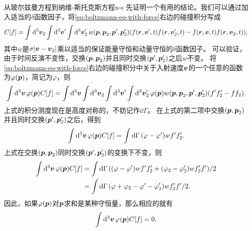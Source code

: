 \begin{back}{从玻尔兹曼方程到纳维-斯托克斯方程}{n-s}
    先证明一个有用的结论。我们可以通过加入适当的$\delta$函数因子，将\eqref{eq:boltzmann-eq-with-force}右边的碰撞积分写成
    \begin{equation}
        C[f] = \int \dd[3]{\vb*{v}_2} \int \dd[3]{\vb*{v}'} \int \dd[3]{\vb*{v}_2'} w(\vb*{p}, \vb*{p}_2, \vb*{p}', \vb*{p}_2') (f(\vb*{r}, \vb*{v}', t) f(\vb*{r}, \vb*{v}'_{2}, t) - f(\vb*{r}, \vb*{v}, t) f(\vb*{r}, \vb*{v}_{2}, t)),
    \end{equation}
    其中$w$是$\sigma \abs{\vb*{v} - \vb*{v}_2}$乘以适当的保证能量守恒和动量守恒的$\delta$函数因子。
    可以验证，由于时间反演不变性，交换$(\vb*{p}, \vb*{p}_2)$并且同时交换$(\vb*{p}', \vb*{p}_2')$之后$w$不变。
    将\eqref{eq:boltzmann-eq-with-force}右边的碰撞积分中关于入射速度$\vb*{v}$的一个任意的函数为$\varphi(\vb*{p})$，简记为$\varphi$，则
    \[
        \int \dd[3]{\vb*{v}} \varphi(\vb*{p}) C[f] = \int \dd[3]{\vb*{v}} \int \dd[3]{\vb*{v}_2} \int \dd[3]{\vb*{v}'} \int \dd[3]{\vb*{v}_2'} \varphi(\vb*{p}) w(\vb*{p}, \vb*{p}_2, \vb*{p}', \vb*{p}_2') (f' f_2' - f f_2).
    \]
    上式的积分测度现在是高度对称的，不妨记作$\dd{\Gamma}$。
    在上式的第二项中交换$(\vb*{p}, \vb*{p}_2)$并且同时交换$(\vb*{p}', \vb*{p}_2')$之后，得到
    \[
        \int \dd[3]{\vb*{v}} \varphi(\vb*{p}) C[f] = \int \dd{\Gamma} (\varphi - \varphi') w f' f_2'.
    \]
    上式在交换$(\vb*{p}, \vb*{p}_2)$同时交换$(\vb*{p}', \vb*{p}_2')$的变换下不变，则
    \[
        \begin{aligned}
            \int \dd[3]{\vb*{v}} \varphi(\vb*{p}) C[f] &= \int \dd{\Gamma} ((\varphi - \varphi') w f' f_2' + (\varphi_2 - \varphi_2') w f'_2 f') / 2 \\
            &= \int \dd{\Gamma} (\varphi + \varphi_2 - \varphi' - \varphi'_2) w f'_2 f' / 2.
        \end{aligned}
    \]
    因此，如果$\varphi(\vb*{p})$对$\vb*{p}$求和是某种守恒量，那么相应的就有
    \begin{equation}
        \int \dd[3]{\vb*{v}} \varphi(\vb*{p}) C[f] = 0.
        \label{eq:collision-conservation}
    \end{equation}


\end{back}
